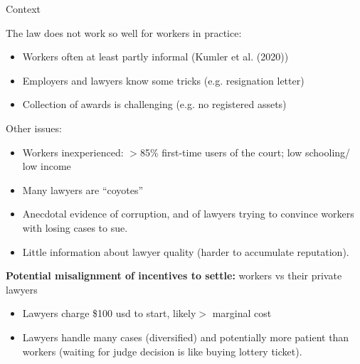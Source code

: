 \documentclass[9pt]{beamer}
\begin{document}
 

 \begin{frame}{Context}
    
The law does not work so well for workers in practice:
    \begin{itemize}
        \item Workers often at least partly informal (Kumler et al. (2020))
        \item Employers and lawyers know some tricks (e.g. resignation letter)
        \item Collection of awards is challenging (e.g. no registered assets)
    \end{itemize}

\pause
\vspace{5mm}
Other issues:
\begin{itemize}
        \item Workers inexperienced: $>$85\% first-time users of the court; low schooling/ low income 
        \item Many lawyers are ``coyotes''
        \item Anecdotal evidence of corruption, and of lawyers trying to convince workers with losing cases to sue.
        \item Little information about lawyer quality (harder to accumulate reputation).
    \end{itemize}
    
    \pause
    \vspace{.2in}
    \textbf{Potential misalignment of incentives to settle:} workers vs their private lawyers
    \begin{itemize}
        \item Lawyers charge \$100 usd to start, likely$>$ marginal cost
        \item Lawyers handle many cases (diversified) and potentially more patient than workers (waiting for judge decision is like buying lottery ticket).
        
    \end{itemize}
    

  \end{frame}

  
\end{document}
